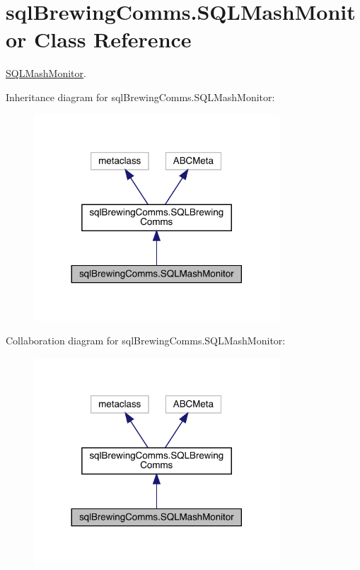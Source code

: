 \hypertarget{classsql_brewing_comms_1_1_s_q_l_mash_monitor}{}\section{sql\+Brewing\+Comms.\+S\+Q\+L\+Mash\+Monitor Class Reference}
\label{classsql_brewing_comms_1_1_s_q_l_mash_monitor}


\mbox{\hyperlink{classsql_brewing_comms_1_1_s_q_l_mash_monitor}{S\+Q\+L\+Mash\+Monitor}}.  




Inheritance diagram for sql\+Brewing\+Comms.\+S\+Q\+L\+Mash\+Monitor\+:\nopagebreak
\begin{figure}[H]
\begin{center}
\leavevmode
\includegraphics[width=260pt]{classsql_brewing_comms_1_1_s_q_l_mash_monitor__inherit__graph}
\end{center}
\end{figure}


Collaboration diagram for sql\+Brewing\+Comms.\+S\+Q\+L\+Mash\+Monitor\+:\nopagebreak
\begin{figure}[H]
\begin{center}
\leavevmode
\includegraphics[width=260pt]{classsql_brewing_comms_1_1_s_q_l_mash_monitor__coll__graph}
\end{center}
\end{figure}
